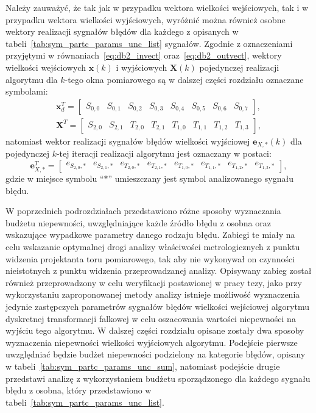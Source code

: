 Należy zauważyć, że tak jak w przypadku wektora wielkości wejściowych, tak i w przypadku wektora wielkości wyjściowych, wyróżnić można również osobne wektory realizacji sygnałów błędów dla każdego z opisanych w tabeli~\ref{tab:sym_partc_params_unc_list} sygnałów. Zgodnie z oznaczeniami przyjętymi w równaniach~\eqref{eq:db2_invect} oraz~\eqref{eq:db2_outvect}, wektory wielkości wejściowych $\mathbf{x}(k)$ i wyjściowych $\mathbf{X}(k)$ pojedynczej realizacji algorytmu dla $k$-tego okna pomiarowego są w dalszej części rozdziału oznaczane symbolami:
\begin{gather}
\mathbf{x}_{d}^{T} =
\begin{bmatrix}
S_{0,0} & S_{0,1} & S_{0,2} & S_{0,3} & S_{0,4} & S_{0,5} & S_{0,6} & S_{0,7}
\end{bmatrix}
\label{eq:sym_partd_invect}, \\
\mathbf{X}^{T} =
\begin{bmatrix}
S_{2,0} & S_{2,1} & T_{2,0} & T_{2,1} & T_{1,0} & T_{1,1} & T_{1,2} & T_{1,3}
\end{bmatrix}
\label{eq:sym_partd_outvect},
\end{gather}
natomiast wektor realizacji sygnałów błędów wielkości wyjściowej  $\mathbf{e}_{X,*}(k)$ dla pojedynczej $k$-tej iteracji realizacji algorytmu jest oznaczany w postaci:
\begin{equation}
\mathbf{e}_{X,*}^{T} =
\begin{bmatrix}
e_{S_{2,0},*} & e_{S_{2,1},*} & e_{T_{2,0},*} & e_{T_{2,1},*} & e_{T_{1,0},*} & e_{T_{1,1},*} & e_{T_{1,2},*} & e_{T_{1,3},*}
\end{bmatrix}
\label{eq:sym_partd_errvect},
\end{equation}
gdzie w miejsce symbolu \enquote{$*$} umieszczany jest symbol analizowanego sygnału błędu.

W poprzednich podrozdziałach przedstawiono różne sposoby wyznaczania budżetu niepewności, uwzględniające każde źródło błędu z osobna oraz wskazujące wypadkowe parametry danego rodzaju błędu. Zabiegi te miały na celu wskazanie optymalnej drogi analizy właściwości metrologicznych z punktu widzenia projektanta toru pomiarowego, tak aby nie wykonywał on czynności nieistotnych z punktu widzenia przeprowadzanej analizy. Opisywany zabieg został również przeprowadzony w celu weryfikacji postawionej w pracy tezy, jako przy wykorzystaniu zaproponowanej metody analizy istnieje możliwość wyznaczenia jedynie zastępczych parametrów sygnałów błędów wielkości wejściowej algorytmu dyskretnej transformacji falkowej w celu oszacowania wartości niepewności na wyjściu tego algorytmu. W dalszej części rozdziału opisane zostały dwa sposoby wyznaczenia niepewności wielkości wyjściowych algorytmu. Podejście pierwsze uwzględniać będzie budżet niepewności podzielony na kategorie błędów, opisany w tabeli~\ref{tab:sym_partc_params_unc_sum}, natomiast podejście drugie przedstawi analizę z wykorzystaniem budżetu sporządzonego dla każdego sygnału błędu z osobna, który przedstawiono w tabeli~\ref{tab:sym_partc_params_unc_list}.

